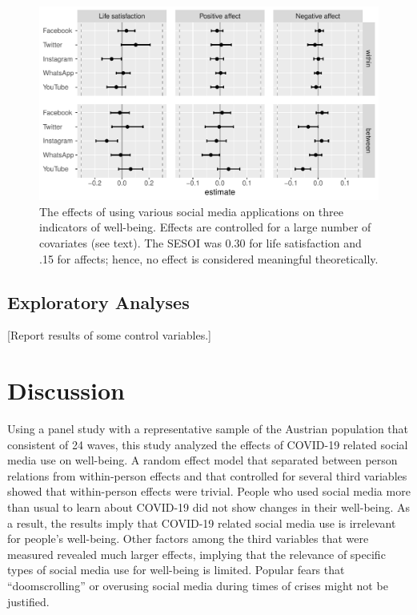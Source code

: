 \documentclass[
  english,
  man,mask,floatsintext]{apa6}
\begin{document}
\begin{figure}[!h]
\includegraphics[width=\textwidth]{figures/fig_results_channel} \caption{The effects of using various social media applications on three indicators of well-being. Effects are controlled for a large number of covariates (see text). The SESOI was 0.30 for life satisfaction and .15 for affects; hence, no effect is considered meaningful theoretically.}\label{fig:fig-res-channels}
\end{figure}

\hypertarget{exploratory-analyses}{%
\subsection{Exploratory Analyses}\label{exploratory-analyses}}

{[}Report results of some control variables.{]}

\hypertarget{discussion}{%
\section{Discussion}\label{discussion}}

Using a panel study with a representative sample of the Austrian population that consistent of 24 waves, this study analyzed the effects of COVID-19 related social media use on well-being.
A random effect model that separated between person relations from within-person effects and that controlled for several third variables showed that within-person effects were trivial.
People who used social media more than usual to learn about COVID-19 did not show changes in their well-being.
As a result, the results imply that COVID-19 related social media use is irrelevant for people's well-being.
Other factors among the third variables that were measured revealed much larger effects, implying that the relevance of specific types of social media use for well-being is limited.
Popular fears that ``doomscrolling'' or overusing social media during times of crises might not be justified.
\end{document}
